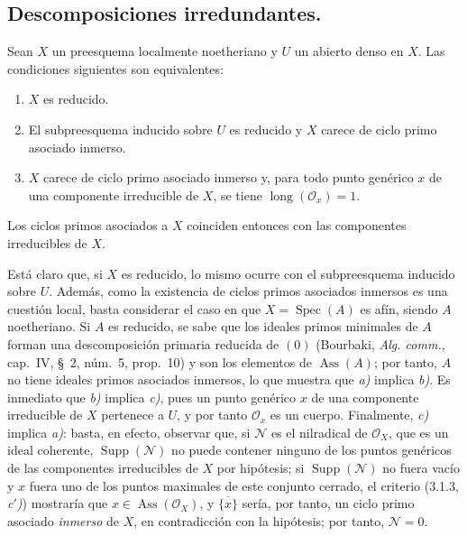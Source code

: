 \subsection{Descomposiciones irredundantes.}

\begin{proposition}[3.2.1]
\label{IV.2.3.2.1-fr}
Sean $X$ un preesquema localmente noetheriano y $U$ un abierto denso en $X$.
Las condiciones siguientes son equivalentes:
\begin{enumerate}
\item[\emph{a)}] $X$ es reducido.
\item[\emph{b)}] El subpreesquema inducido sobre $U$ es reducido y $X$ carece de
ciclo primo asociado inmerso.
\item[\emph{c)}] $X$ carece de ciclo primo asociado inmerso y, para todo punto
genérico $x$ de una componente irreducible de $X$, se tiene
$\operatorname{long}(\mathcal O_x)=1$.
\end{enumerate}
Los ciclos primos asociados a $X$ coinciden entonces con las componentes
irreducibles de $X$.
\end{proposition}

Está claro que, si $X$ es reducido, lo mismo ocurre con el subpreesquema
inducido sobre $U$. Además, como la existencia de ciclos primos asociados
inmersos es una cuestión local, basta considerar el caso en que
$X=\operatorname{Spec}(A)$ es afín, siendo $A$ noetheriano. Si $A$ es
reducido, se sabe que los ideales primos minimales de $A$ forman una
descomposición primaria reducida de $(0)$ (Bourbaki, \emph{Alg. comm.},
cap.~IV, \S~2, núm.~5, prop.~10) y son los elementos de
$\operatorname{Ass}(A)$; por tanto, $A$ no tiene ideales primos asociados
inmersos, lo que muestra que \emph{a)} implica \emph{b)}. Es inmediato
que \emph{b)} implica \emph{c)}, pues un punto genérico $x$ de una componente
irreducible de $X$ pertenece a $U$, y por tanto $\mathcal O_x$ es un cuerpo.
Finalmente, \emph{c)} implica \emph{a)}: basta, en efecto, observar que, si
$\mathcal N$ es el nilradical de $\mathcal O_X$, que es un ideal coherente,
$\operatorname{Supp}(\mathcal N)$ no puede contener ninguno de los puntos
genéricos de las componentes irreducibles de $X$ por hipótesis; si
$\operatorname{Supp}(\mathcal N)$ no fuera vacío y $x$ fuera uno de los puntos
maximales de este conjunto cerrado, el criterio (3.1.3, \emph{c$'$)}) mostraría
que $x\in\operatorname{Ass}(\mathcal O_X)$, y $\overline{\{x\}}$ sería, por
tanto, un ciclo primo asociado \emph{inmerso} de $X$, en contradicción con la
hipótesis; por tanto, $\mathcal N=0$.
